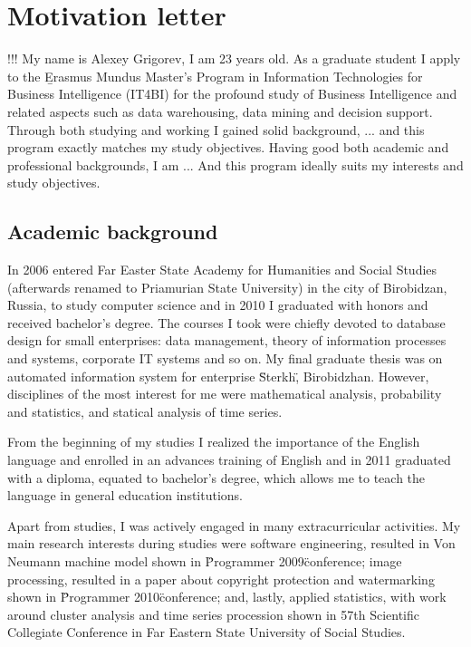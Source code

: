 \documentclass[a4paper,14pt]{extarticle}
\begin{document}
\section*{Motivation letter}

!!!
My name is Alexey Grigorev, I am 23 years old. As a graduate student I apply to the \b{Erasmus Mundus Master's Program in Information Technologies for Business Intelligence (IT4BI)} for the profound study of Business Intelligence and related aspects such as data warehousing, data mining and decision support. Through both studying and working I gained solid background, ...  and this program exactly matches my study objectives. Having good both academic and professional backgrounds, I am ... And this program ideally suits my interests and study objectives.


\subsection*{Academic background}

In 2006 entered Far Easter State Academy for Humanities and Social Studies (afterwards renamed to Priamurian State University) in the city of Birobidzan, Russia, to study computer science and in 2010 I graduated with honors and received bachelor's degree. The courses I took were chiefly devoted to database design for small enterprises: data management, theory of information processes and systems, corporate IT systems and so on. My final graduate thesis was on automated information system for enterprise \"Sterkh\", Birobidzhan. However, disciplines of the most interest for me were mathematical analysis, probability and statistics, and statical analysis of time series.

From the beginning of my studies I realized the importance of the English language and enrolled in an advances training of English and in 2011 graduated with a diploma, equated to bachelor's degree, which allows me to teach the language in general education institutions.

Apart from studies, I was actively engaged in many extracurricular activities. My main research interests during studies were software engineering, resulted in Von Neumann machine model shown in \"Programmer 2009\" conference; image processing, resulted in a paper about copyright protection and watermarking shown in \"Programmer 2010\" conference; and, lastly, applied statistics, with work around cluster analysis and time series procession shown in 57th Scientific Collegiate Conference in Far Eastern State University of Social Studies.
\end{document}
